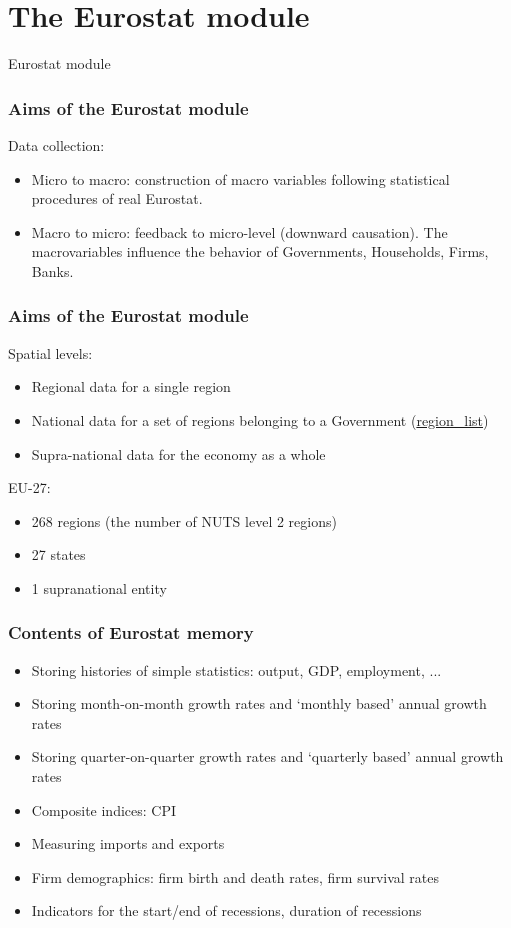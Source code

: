 \documentclass{beamer}
\begin{document}
\section{The Eurostat module}
\begin{frame}{}
\LARGE Eurostat module
\end{frame}

\begin{frame}{}
\frametitle{Aims of the Eurostat module}
Data collection:
\begin{itemize}
\item Micro to macro: construction of macro variables following statistical procedures of real Eurostat.
\item Macro to micro: feedback to micro-level (downward causation). The macrovariables influence the behavior of Governments, Households, Firms, Banks.
\end{itemize}
\end{frame}

\begin{frame}{}
\frametitle{Aims of the Eurostat module}
Spatial levels:
\begin{itemize}
\item Regional data for a single region
\item National data for a set of regions belonging to a Government (\url{region_list})
\item Supra-national data for the economy as a whole
\end{itemize}

EU-27:
\begin{itemize}
\item 268 regions (the number of NUTS level 2 regions)
\item 27 states
\item 1 supranational entity
\end{itemize}
\end{frame}

\begin{frame}{}
\frametitle{Contents of Eurostat memory}
\begin{itemize}
    \item Storing histories of simple statistics: output, GDP, employment, ...
    \item Storing month-on-month growth rates and `monthly based' annual growth rates
    \item Storing quarter-on-quarter growth rates and `quarterly based' annual growth rates
    \item Composite indices: CPI
    \item Measuring imports and exports
    \item Firm demographics: firm birth and death rates, firm survival rates
    \item Indicators for the start/end of recessions, duration of recessions
\end{itemize}    
\end{frame}
\end{document}
